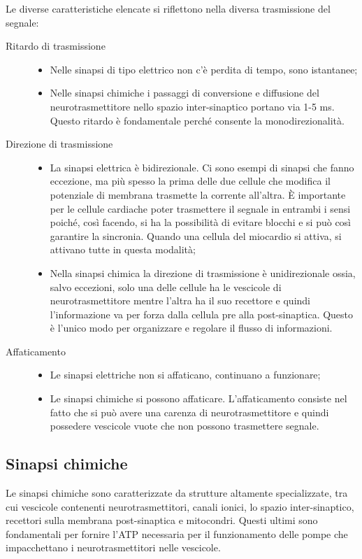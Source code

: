 Le diverse caratteristiche elencate si riflettono nella diversa trasmissione del segnale:
\begin{description}
    \item[Ritardo di trasmissione]
    \begin{itemize}
        \item Nelle sinapsi di tipo elettrico non c’è perdita di tempo, sono istantanee;
        \item Nelle sinapsi chimiche i passaggi di conversione e diffusione del neurotrasmettitore nello spazio inter-sinaptico portano via 1-5 ms. Questo ritardo è fondamentale perché consente la monodirezionalità.
    \end{itemize}
    \item[Direzione di trasmissione]
    \begin{itemize}
        \item La sinapsi elettrica è bidirezionale. Ci sono esempi di sinapsi che fanno eccezione, ma più spesso la prima delle due cellule che modifica il potenziale di membrana trasmette la corrente all’altra. È importante per le cellule cardiache poter trasmettere il segnale in entrambi i sensi poiché, così facendo, si ha la possibilità di evitare blocchi e si può così garantire la sincronia. Quando una cellula del miocardio si attiva, si attivano tutte in questa modalità;
        \item Nella sinapsi chimica la direzione di trasmissione è unidirezionale ossia, salvo eccezioni, solo una delle cellule ha le vescicole di neurotrasmettitore mentre l’altra ha il suo recettore e quindi l’informazione va per forza dalla cellula pre alla post-sinaptica. Questo è l’unico modo per organizzare e regolare il flusso di informazioni.
    \end{itemize}
    \item[Affaticamento]
    \begin{itemize}
        \item Le sinapsi elettriche non si affaticano, continuano a funzionare;
        \item Le sinapsi chimiche si possono affaticare. L’affaticamento consiste nel fatto che si può avere una carenza di neurotrasmettitore e quindi possedere vescicole vuote che non possono trasmettere segnale.
    \end{itemize}
\end{description}

\subsection{Sinapsi chimiche}
Le sinapsi chimiche sono caratterizzate da strutture altamente specializzate, tra cui vescicole contenenti neurotrasmettitori, canali ionici, lo spazio inter-sinaptico, recettori sulla membrana post-sinaptica e mitocondri. Questi ultimi sono fondamentali per fornire l'ATP necessaria per il funzionamento delle pompe che impacchettano i neurotrasmettitori nelle vescicole.

